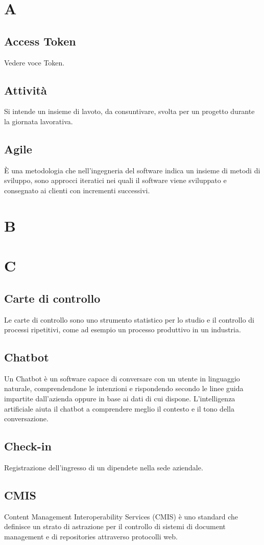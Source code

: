 \section{A}
\subsection{Access Token}
Vedere voce Token.
\subsection{Attività}
Si intende un insieme di lavoto, da consuntivare, svolta per un progetto durante la giornata lavorativa.
\subsection{Agile}
È una metodologia che nell'ingegneria del software indica un insieme di metodi di sviluppo, sono approcci iteratici nei quali il software viene sviluppato e consegnato ai clienti con incrementi successivi.
\newpage
\section{B}
\section{C}
\subsection{Carte di controllo}
Le carte di controllo sono uno strumento statistico per lo studio e il controllo di processi ripetitivi, come ad esempio un processo produttivo in un industria.
\subsection{Chatbot}
Un Chatbot è un software capace di conversare con un utente in linguaggio naturale, comprendendone 
le intenzioni e rispondendo secondo le linee guida impartite dall'azienda oppure in 
base ai dati di cui dispone. L'intelligenza artificiale aiuta il chatbot a comprendere meglio il 
contesto e il tono della conversazione.
\subsection{Check-in}
Registrazione dell'ingresso di un dipendete nella sede aziendale.
\subsection{CMIS}
Content Management Interoperability Services (CMIS) è uno standard che definisce un strato di astrazione per il controllo di
sistemi di document management e di repositories attraverso protocolli web.

